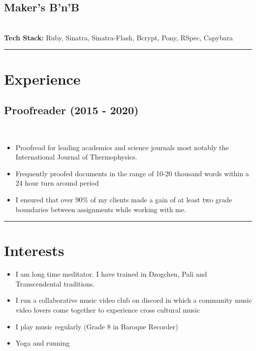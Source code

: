 \documentclass[12pt]{IEEEtran}
\newcommand{\cvrule}{\noindent\rule{8.5cm}{0.4pt}}
\begin{document}
\subsection*{Maker's B'n'B}
 \\
\textbf{Tech Stack:} Ruby, Sinatra, Sinatra-Flash, Bcrypt, Pony, RSpec, Capybara %

\cvrule
\vskip 0.35in

\section*{\textbf{Experience}}

\subsection*{Proofreader (2015 - 2020)}
\\[1pt]
\begin{itemize}
\item Proofread for leading academics and science journals most notably the International Journal of Thermophysics.
\item Frequently proofed documents in the range of 10-20 thousand words within a 24 hour turn around period
\item I ensured that over 90\% of my clients made a gain of at least two grade boundaries between assignments while working with me.
\end{itemize}

\cvrule
\vskip 0.35in
\section*{I\textbf{nterests}}

\begin{itemize}
\item I am long time meditator. I have trained in Dzogchen, Pali and Transcendental traditions.
\item I run a collaborative music video club on discord in which a community music video lovers come together to experience cross cultural music
\item I play music regularly (Grade 8 in Baroque Recorder)
\item Yoga and running
\end{itemize}
\end{document}
